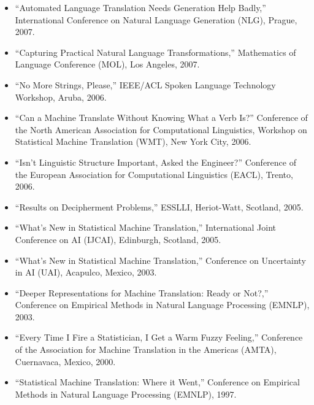 \begin{itemize}
\item ``Automated Language Translation Needs Generation Help Badly,'' International Conference on Natural Language Generation (NLG), Prague, 2007.
\item ``Capturing Practical Natural Language Transformations,'' Mathematics of Language Conference (MOL), Los Angeles, 2007.
\item ``No More Strings, Please,'' IEEE/ACL Spoken Language Technology Workshop, Aruba, 2006.
\item ``Can a Machine Translate Without Knowing What a Verb Is?'' Conference of the North American Association for Computational Linguistics, Workshop on Statistical Machine Translation (WMT), New York City, 2006.
\item ``Isn't Linguistic Structure Important, Asked the Engineer?'' Conference of the European Association for Computational Linguistics (EACL), Trento, 2006.
\item ``Results on Decipherment Problems,'' ESSLLI, Heriot-Watt, Scotland, 2005.
\item ``What's New in Statistical Machine Translation,'' International Joint Conference on AI (IJCAI), Edinburgh, Scotland, 2005.
\item ``What's New in Statistical Machine Translation,'' Conference on Uncertainty in AI (UAI), Acapulco, Mexico, 2003.
\item ``Deeper Representations for Machine Translation: Ready or Not?,'' Conference on Empirical Methods in Natural Language Processing (EMNLP), 2003.
\item ``Every Time I Fire a Statistician, I Get a Warm Fuzzy Feeling,'' Conference of the Association for Machine Translation in the Americas (AMTA), Cuernavaca, Mexico, 2000.
\item ``Statistical Machine Translation: Where it Went,'' Conference on Empirical Methods in Natural Language Processing (EMNLP), 1997.
\end{itemize}



